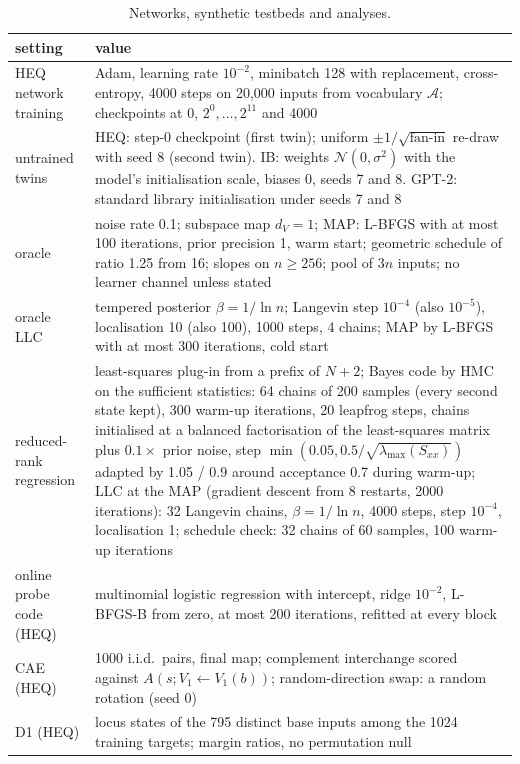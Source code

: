 \documentclass[11pt,a4paper]{article}
\newcommand{\dv}{d_V}
\begin{document}
\begin{table}[htbp]
\centering
\footnotesize
\caption{Networks, synthetic testbeds and analyses.}
\label{tab:hyper:other}
\begin{tabular}{p{}p{}}
\toprule
setting & value\\
\midrule
HEQ network training & Adam, learning rate $10^{-2}$, minibatch 128 with replacement, cross-entropy, 4000 steps on 20{,}000 inputs from vocabulary $\mathcal A$; checkpoints at 0, $2^0,\dots,2^{11}$ and 4000\\
untrained twins & HEQ: step-0 checkpoint (first twin); uniform $\pm1/\sqrt{\text{fan-in}}$ re-draw with seed 8 (second twin). IB: weights $\mathcal N(0,\sigma^2)$ with the model's initialisation scale, biases 0, seeds 7 and 8. GPT-2: standard library initialisation under seeds 7 and 8\\
\midrule
oracle & noise rate 0.1; subspace map $\dv=1$; MAP: L-BFGS with at most 100 iterations, prior precision 1, warm start; geometric schedule of ratio 1.25 from 16; slopes on $n\ge256$; pool of $3n$ inputs; no learner channel unless stated\\
oracle LLC & tempered posterior $\beta=1/\ln n$; Langevin step $10^{-4}$ (also $10^{-5}$), localisation 10 (also 100), 1000 steps, 4 chains; MAP by L-BFGS with at most 300 iterations, cold start\\
reduced-rank regression & least-squares plug-in from a prefix of $N+2$; Bayes code by HMC on the sufficient statistics: 64 chains of 200 samples (every second state kept), 300 warm-up iterations, 20 leapfrog steps, chains initialised at a balanced factorisation of the least-squares matrix plus $0.1\times$ prior noise, step $\min(0.05,0.5/\sqrt{\lambda_{\max}(S_{xx})})$ adapted by 1.05 / 0.9 around acceptance 0.7 during warm-up; LLC at the MAP (gradient descent from 8 restarts, 2000 iterations): 32 Langevin chains, $\beta=1/\ln n$, 4000 steps, step $10^{-4}$, localisation 1; schedule check: 32 chains of 60 samples, 100 warm-up iterations\\
\midrule
online probe code (HEQ) & multinomial logistic regression with intercept, ridge $10^{-2}$, L-BFGS-B from zero, at most 200 iterations, refitted at every block\\
CAE (HEQ) & 1000 i.i.d.\ pairs, final map; complement interchange scored against $A(s;V_1\leftarrow V_1(b))$; random-direction swap: a random rotation (seed 0)\\
D1 (HEQ) & locus states of the 795 distinct base inputs among the 1024 training targets; margin ratios, no permutation null\\

\end{tabular}
\end{table}
\end{document}
